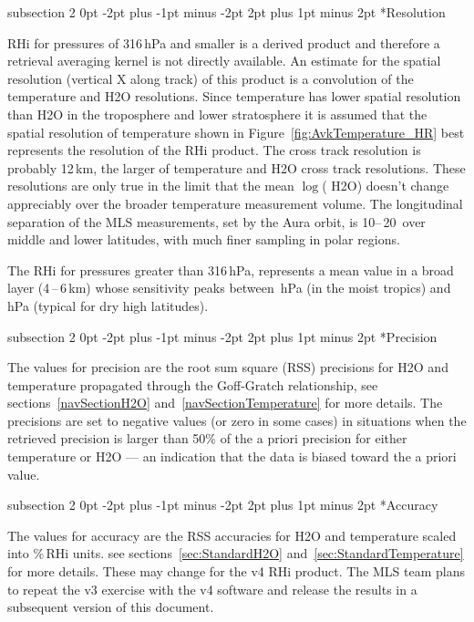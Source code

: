 \documentclass[11pt,draft]{report}
\makeatletter
\renewcommand{\subsection}{\@startsection%
  {subsection}%
  {2}%
  {0pt}%
  {-2pt plus -1pt minus -2pt}%
  {2pt plus 1pt minus 2pt}%
  {\large\sffamily\fontseries{sb}\selectfont\flushleft\color{SectionColor}\figureversion{tabular}}}%
\makeatother
\begin{document}
\subsection*{Resolution}

RHi for pressures of 316\,hPa and smaller is a derived product and
therefore a retrieval averaging kernel is not directly available.  An
estimate for the spatial resolution (vertical X along track) of this
product is a convolution of the temperature and H\cs2O
resolutions. Since temperature has lower spatial resolution than H\cs2O
in the troposphere and lower stratosphere it is assumed that the spatial
resolution of temperature shown in Figure~\ref{fig:AvkTemperature_HR}
best represents the resolution of the RHi product. The cross track
resolution is probably 12\,km, the larger of temperature and H\cs2O
cross track resolutions.  These resolutions are only true in the limit
that the mean $\log$( H\cs2O) doesn't change appreciably over the
broader temperature measurement volume. The longitudinal separation of
the MLS measurements, set by the Aura orbit, is 10\degsym--\,20\degsym\
over middle and lower latitudes, with much finer sampling in polar
regions.

The RHi for pressures greater than 316\,hPa, represents a mean value in
a broad layer (4\,--\,6\,km) whose sensitivity peaks between
\,hPa (in the moist tropics) and \,hPa
(typical for dry high latitudes).

\subsection*{Precision}

The values for precision are the root sum square (RSS) precisions for
H\cs2O and temperature propagated through the Goff-Gratch relationship,
see sections~\ref{navSectionH2O} and~\ref{navSectionTemperature} for
more details. The precisions are set to negative values (or zero in some
cases) in situations when the retrieved precision is larger than 50\% of
the a priori precision for either temperature or H\cs2O --- an
indication that the data is biased toward the a priori value.

\subsection*{Accuracy}

The values for accuracy are the RSS accuracies for H\cs2O and
temperature scaled into \%\,RHi units. see
sections~\ref{sec:StandardH2O} and~\ref{sec:StandardTemperature} for
more details.  These may change for the v4 RHi product. The MLS team
plans to repeat the v3 exercise with the v4 software and release the
results in a subsequent version of this document.
\end{document}
